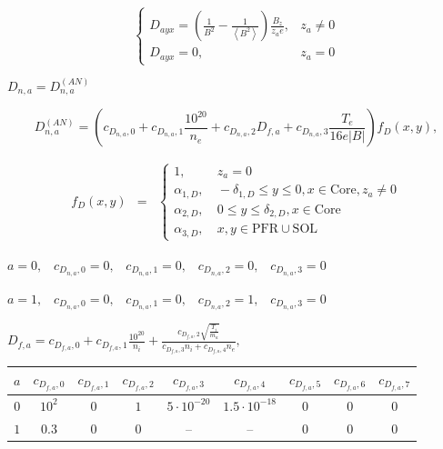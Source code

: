 \documentclass[a4paper,10pt]{report}
\begin{document}
\begin{equation}
\left\{
\begin{matrix}
D_{ayx} = \left( \frac 1{B^2} - \frac 1{\left\langle B^2\right\rangle} \right)  \frac{B_z}{z_a e}, & z_a \neq 0\\
D_{ayx} = 0, & z_a=0
\end{matrix}
\right.
\end{equation}

$D_{n,a} = D^{(AN)}_{n,a}$

\begin{equation}
D^{(AN)}_{n,a}=\left( c_{D_{n,a},0}+c_{D_{n,a},1}\frac{10^{20}}{n_e}+c_{D_{n,a},2}D_{f,a}+c_{D_{n,a},3}\frac{T_e}{16 e|B|}\right)f_D(x,y),
\end{equation}

\begin{equation}
\begin{matrix}
f_D(x,y) & =
& \left\{
\begin{matrix}
1, & \ z_a = 0 \\
\alpha_{1,D}, & \ -\delta _{1,D}\le y\le 0, x\in \text{Core}, z_a \neq 0 \\
\alpha_{2,D}, & \ 0\le y\le \delta _{2,D}, x\in \text{Core} \\
\alpha_{3,D}, & \ x,y\in \text{PFR} \cup \text{SOL}
\end{matrix} \right.
\end{matrix}
\end{equation}

$a=0,\;\;\;c_{D_{n,a},0}=0,\;\;\;c_{D_{n,a},1}=0,\;\;\;c_{D_{n,a},2}=0,\;\;\;c_{D_{n,a},3}=0$

$ a=1,\;\;\; c_{D_{n,a},0}=0,\;\;\;c_{D_{n,a},1}=0,\;\;\;c_{D_{n,a},2}=1,\;\;\;c_{D_{n,a},3}=0$

$D_{f,a}=c_{D_{f,a},0} + c_{D_{f,a},1} \frac{10^{20}}{n_i}
+ \frac{
	c_{D_{f,a},2} \sqrt{\frac{T_i}{m_a}}
}{
	c_{D_{f,a},3} n_i + c_{D_{f,a},4} n_e
},$

\begin{table}[h]
\begin{tabular}{|c|c|c|c|c|c|c|c|c|}
\hline
$a$ & $c_{D_{f,a},0}$ & $c_{D_{f,a},1}$ & $c_{D_{f,a},2}$ & $c_{D_{f,a},3}$ & $c_{D_{f,a},4}$ & $c_{D_{f,a},5}$ & $c_{D_{f,a},6}$ & $c_{D_{f,a},7}$ \\ \hline
$0$ & $10^2$ & $0$ & $1$ & $5 \cdot 10^{-20}$ & $1.5 \cdot 10^{-18}$ & $0$ & $0$ & $0$ \\ \hline
$1$ & $0.3$ & $0$ & $0$ & -- & -- & $0$ & $0$ & $0$ \\ \hline
\end{tabular}
\end{table}
\end{document}
